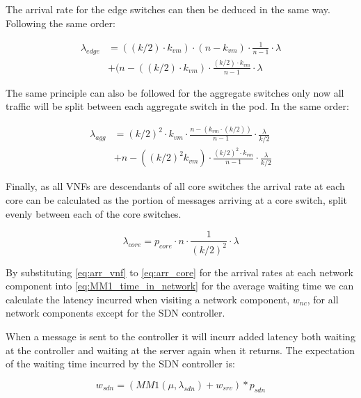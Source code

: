 The arrival rate for the edge switches can then be deduced in the same way. Following the same order:

\begin{equation}
\label{eq:arr_edge}
\begin{split}
\lambda_{edge} &= ((k/2) \cdot k_{vm}) \cdot (n - k_{vm}) \cdot \frac{1}{n - 1} \cdot \lambda \\
			   &+ (n - ((k/2) \cdot k_{vm}) \cdot \frac{(k/2) \cdot k_{vm}}{n - 1} \cdot \lambda 
\end{split}
\end{equation}

The same principle can also be followed for the aggregate switches only now all traffic will be split between each aggregate switch in the pod. In the same order:

\begin{equation}
\label{eq:arr_agg}
\begin{split}
\lambda_{agg} &= (k/2)^2 \cdot k_{vm} \cdot \frac{n - (k_{vm} \cdot (k/2))}{n - 1} \cdot \frac{\lambda}{k/2} \\
			  &+ n - ((k/2)^2 k_{vm}) \cdot \frac{(k/2)^2 \cdot k_{vm}}{n - 1} \cdot \frac{\lambda}{k/2}
\end{split}
\end{equation}

Finally, as all VNFs are descendants of all core switches the arrival rate at each core can be calculated as the portion of messages arriving at a core switch, split evenly between each of the core switches.

\begin{equation}
\label{eq:arr_core}
\lambda_{core} = p_{core} \cdot n \cdot  \frac{1}{(k / 2)^2} \cdot  \lambda
\end{equation}

By substituting \ref{eq:arr_vnf} to \ref{eq:arr_core} for the arrival rates at each network component into \ref{eq:MM1_time_in_network} for the average waiting time we can calculate the latency incurred when visiting a network component, $w_{nc}$, for all network components except for the SDN controller.

When a message is sent to the controller it will incurr added latency both waiting at the controller and waiting at the server again when it returns. The expectation of the waiting time incurred by the SDN controller is:

\begin{equation}
w_{sdn} = (MM1(\mu, \lambda_{sdn}) + w_{srv}) * p_{sdn}
\end{equation}

